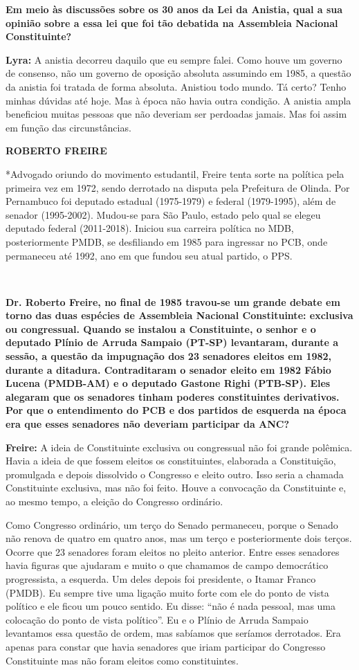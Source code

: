 \textbf{Em meio às discussões sobre os 30 anos da Lei da Anistia, qual a
sua opinião sobre a essa lei que foi tão debatida na Assembleia Nacional
Constituinte?}

\textbf{Lyra:} A anistia decorreu daquilo que eu sempre falei. Como
houve um governo de consenso, não um governo de oposição absoluta
assumindo em 1985, a questão da anistia foi tratada de forma absoluta.
Anistiou todo mundo. Tá certo? Tenho minhas dúvidas até hoje. Mas à
época não havia outra condição. A anistia ampla beneficiou muitas
pessoas que não deveriam ser perdoadas jamais. Mas foi assim em função
das circunstâncias.

\textbf{ROBERTO FREIRE}

*Advogado oriundo do movimento estudantil, Freire tenta sorte na
política pela primeira vez em 1972, sendo derrotado na disputa pela
Prefeitura de Olinda. Por Pernambuco foi deputado estadual (1975-1979) e
federal (1979-1995), além de senador (1995-2002). Mudou-se para São
Paulo, estado pelo qual se elegeu deputado federal (2011-2018). Iniciou
sua carreira política no MDB, posteriormente PMDB, se desfiliando em
1985 para ingressar no PCB, onde permaneceu até 1992, ano em que fundou
seu atual partido, o PPS.

​

\textbf{Dr. Roberto Freire, no final de 1985 travou-se um grande debate
em torno das duas espécies de Assembleia Nacional Constituinte:
exclusiva ou congressual. Quando se instalou a Constituinte, o senhor e
o deputado Plínio de Arruda Sampaio (PT-SP) levantaram, durante a
sessão, a questão da impugnação dos 23 senadores eleitos em 1982,
durante a ditadura. Contraditaram o senador eleito em 1982 Fábio Lucena
(PMDB-AM) e o deputado Gastone Righi (PTB-SP). Eles alegaram que os
senadores tinham poderes constituintes derivativos. Por que o
entendimento do PCB e dos partidos de esquerda na época era que esses
senadores não deveriam participar da ANC?}

\textbf{Freire:} A ideia de Constituinte exclusiva ou congressual não
foi grande polêmica. Havia a ideia de que fossem eleitos os
constituintes, elaborada a Constituição, promulgada e depois dissolvido
o Congresso e eleito outro. Isso seria a chamada Constituinte exclusiva,
mas não foi feito. Houve a convocação da Constituinte e, ao mesmo tempo,
a eleição do Congresso ordinário.

Como Congresso ordinário, um terço do Senado permaneceu, porque o Senado
não renova de quatro em quatro anos, mas um terço e posteriormente dois
terços. Ocorre que 23 senadores foram eleitos no pleito anterior. Entre
esses senadores havia figuras que ajudaram e muito o que chamamos de
campo democrático progressista, a esquerda. Um deles depois foi
presidente, o Itamar Franco (PMDB). Eu sempre tive uma ligação muito
forte com ele do ponto de vista político e ele ficou um pouco sentido.
Eu disse: ``não é nada pessoal, mas uma colocação do ponto de vista
político''. Eu e o Plínio de Arruda Sampaio levantamos essa questão de
ordem, mas sabíamos que seríamos derrotados. Era apenas para constar que
havia senadores que iriam participar do Congresso Constituinte mas não
foram eleitos como constituintes.

